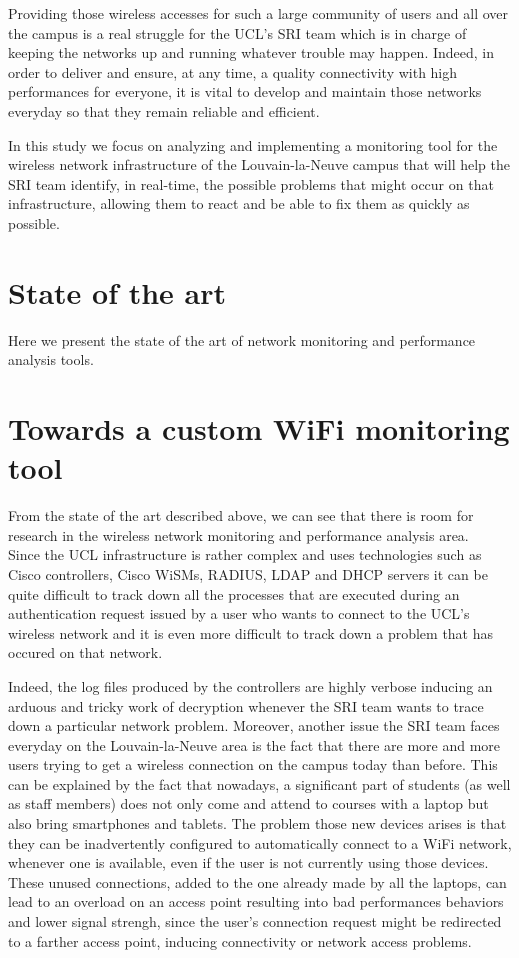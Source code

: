 Providing those wireless accesses for such a large community of users and all over the campus is a real struggle for the UCL's SRI team which is in charge of keeping the networks up and running whatever trouble may happen. Indeed, in order to deliver and ensure, at any time, a quality connectivity with high performances for everyone, it is vital to develop and maintain those networks everyday so that they remain reliable and efficient.
 
In this study we focus on analyzing and implementing a monitoring tool for the wireless network infrastructure of the Louvain-la-Neuve campus that will help the SRI team identify, in real-time, the possible problems that might occur on that infrastructure, allowing them to react and be able to fix them as quickly as possible.

\section{State of the art}
Here we present the state of the art of network monitoring and performance analysis tools.\\



\section{Towards a custom WiFi monitoring tool}
From the state of the art described above, we can see that there is room for research in the wireless network monitoring and performance analysis area.\\
Since the UCL infrastructure is rather complex and uses technologies such as Cisco controllers, Cisco WiSMs, RADIUS, LDAP and DHCP servers it can be quite difficult to track down all the processes that are executed during an authentication request issued by a user who wants to connect to the UCL's wireless network and it is even more difficult to track down a problem that has occured on that network.

Indeed, the log files produced by the controllers are highly verbose inducing an arduous and tricky work of decryption whenever the SRI team wants to trace down a particular network problem. Moreover, another issue the SRI team faces everyday on the Louvain-la-Neuve area is the fact that there are more and more users trying to get a wireless connection on the campus today than before. This can be explained by the fact that nowadays, a significant part of students (as well as staff members) does not only come and attend to courses with a laptop but also bring smartphones and tablets. The problem those new devices arises is that they can be inadvertently configured to automatically connect to a WiFi network, whenever one is available, even if the user is not currently using those devices. These unused connections, added to the one already made by all the laptops, can lead to an overload on an access point resulting into bad performances behaviors and lower signal strengh, since the user's connection request might be redirected to a farther access point, inducing connectivity or network access problems.

